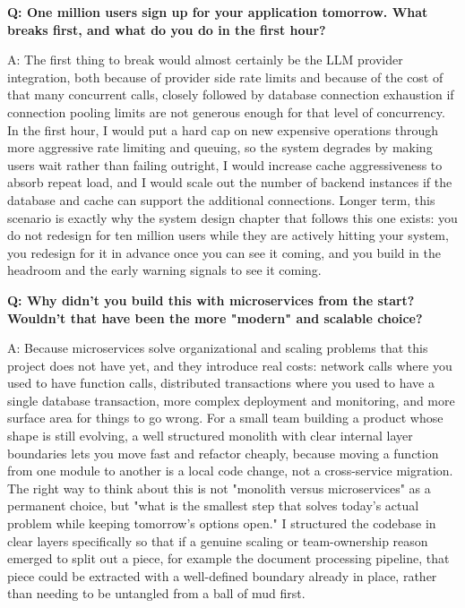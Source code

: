 \documentclass[11pt,a4paper]{report}
\begin{document}
\begin{qabox}
\textbf{Q: One million users sign up for your application tomorrow. What breaks first, and what do you do in the first hour?}

A: The first thing to break would almost certainly be the LLM provider integration, both because of provider side rate limits and because of the cost of that many concurrent calls, closely followed by database connection exhaustion if connection pooling limits are not generous enough for that level of concurrency. In the first hour, I would put a hard cap on new expensive operations through more aggressive rate limiting and queuing, so the system degrades by making users wait rather than failing outright, I would increase cache aggressiveness to absorb repeat load, and I would scale out the number of backend instances if the database and cache can support the additional connections. Longer term, this scenario is exactly why the system design chapter that follows this one exists: you do not redesign for ten million users while they are actively hitting your system, you redesign for it in advance once you can see it coming, and you build in the headroom and the early warning signals to see it coming.
\end{qabox}

\begin{qabox}
\textbf{Q: Why didn't you build this with microservices from the start? Wouldn't that have been the more "modern" and scalable choice?}

A: Because microservices solve organizational and scaling problems that this project does not have yet, and they introduce real costs: network calls where you used to have function calls, distributed transactions where you used to have a single database transaction, more complex deployment and monitoring, and more surface area for things to go wrong. For a small team building a product whose shape is still evolving, a well structured monolith with clear internal layer boundaries lets you move fast and refactor cheaply, because moving a function from one module to another is a local code change, not a cross-service migration. The right way to think about this is not "monolith versus microservices" as a permanent choice, but "what is the smallest step that solves today's actual problem while keeping tomorrow's options open." I structured the codebase in clear layers specifically so that if a genuine scaling or team-ownership reason emerged to split out a piece, for example the document processing pipeline, that piece could be extracted with a well-defined boundary already in place, rather than needing to be untangled from a ball of mud first.
\end{qabox}
\end{document}
